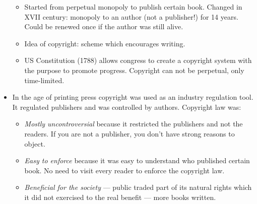\documentclass[twoside,openright]{report}
\begin{document}
\begin{itemize}
\begin{itemize}
 \item        Started from perpetual monopoly to publish certain book. Changed in XVII century: monopoly to an author (not a publisher!) for 14 years. Could be renewed once if the author was still alive.
 \item        Idea of copyright: scheme which encourages writing.
 \item        US Constitution (1788) allows congress to create a copyright system with the purpose to promote progress. Copyright can not be perpetual, only time-limited.
\end{itemize}
 \item    In the age of printing press copyright was used as an industry regulation tool. It regulated publishers and was controlled by authors. Copyright law was:
\begin{itemize}
 \item        \emph{Mostly uncontroversial} because it restricted the publishers and not the readers. If you are not a publisher, you don't have strong reasons to object.
 \item        \emph{Easy to enforce} because it was easy to understand who published certain book. No need to visit every reader to enforce the copyright law.
 \item        \emph{Beneficial for the society} --- public traded part of its natural rights which it did not exercised to the real benefit --- more books written.
\end{itemize}
\end{itemize}
\end{document}
